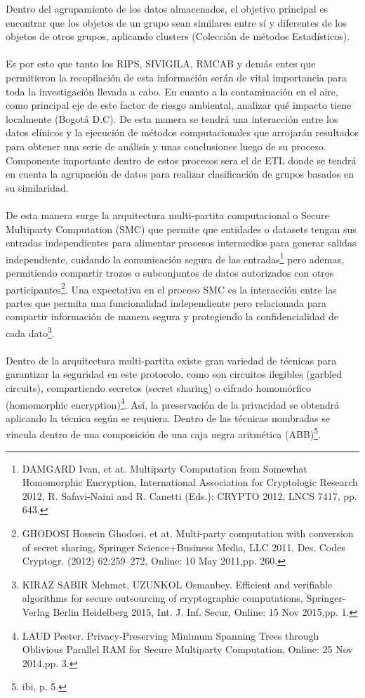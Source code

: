 \documentclass[a4paper,openright,12pt]{book}
\theoremstyle{definition}
\theoremstyle{remark}
\begin{document}
Dentro del agrupamiento de los datos almacenados, el objetivo principal es encontrar que los objetos de un grupo sean similares entre sí y diferentes de los objetos de otros grupos, aplicando clusters (Colección de métodos Estadísticos).\\\\
Es por esto que tanto los  RIPS, SIVIGILA, RMCAB y demás entes que permitieron la recopilación de esta información serán de vital importancia para toda la investigación llevada a cabo. En cuanto a la contaminación en el aire, como principal eje de este factor de riesgo ambiental, analizar qué impacto tiene localmente (Bogotá D.C). De esta manera se tendrá una interacción entre los datos clínicos y la ejecución de métodos computacionales que arrojarán resultados para obtener una serie de análisis y unas conclusiones luego de su proceso. Componente importante dentro de estos procesos sera el de ETL donde se tendrá en cuenta la agrupación de datos para realizar clasificación de grupos basados en su similaridad. \\\\
De esta manera surge la arquitectura multi-partita computacional o  Secure Multiparty Computation (SMC) que permite que entidades o datasets tengan sus entradas independientes para alimentar procesos intermedios para generar salidas independiente, cuidando la comunicación segura de las entradas\footnote{DAMGARD Ivan, et at. Multiparty Computation from Somewhat Homomorphic Encryption, International Association for Cryptologic Research 2012, R. Safavi-Naini and R. Canetti (Eds.): CRYPTO 2012, LNCS 7417, pp. 643.} pero ademas, permitiendo compartir trozos o subconjuntos de datos autorizados con otros participantes\footnote{GHODOSI Hossein Ghodosi, et at. Multi-party computation with conversion of secret sharing, Springer Science+Business Media, LLC 2011, Des. Codes Cryptogr. (2012) 62:259–272, Online: 10 May 2011,pp. 260.}. Una expectativa en el proceso SMC es la interacción entre las partes que permita una funcionalidad independiente pero relacionada para compartir información de manera segura y protegiendo la confidencialidad de cada dato\footnote{KIRAZ SABIR Mehmet, UZUNKOL Osmanbey. Efficient and verifiable algorithms for secure outsourcing of cryptographic computations, Springer-Verlag Berlin Heidelberg 2015, Int. J. Inf. Secur, Online: 15 Nov 2015,pp. 1.}.  \\\\
Dentro de la arquitectura multi-partita existe gran variedad de técnicas para garantizar la seguridad en este protocolo, como son circuitos ilegibles (garbled circuits), compartiendo secretos (secret sharing) o cifrado homomórfico (homomorphic encryption)\footnote{LAUD Peeter. Privacy-Preserving Minimum Spanning Trees through Oblivious Parallel RAM for Secure Multiparty Computation, Online: 25 Nov 2014,pp. 3.}. Así, la preservación de la privacidad se obtendrá aplicando la técnica según se requiera. Dentro de las técnicas nombradas se vincula dentro de una composición de una caja negra aritmética (ABB)\footnote{ibi, p. 5.}.
\end{document}
